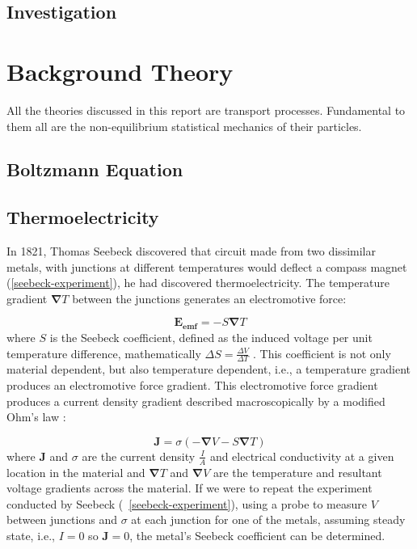 \documentclass[12pt,draft]{article}
\newcommand{\figref}[2][\figurename~]{#1\ref{#2}}
\renewcommand{\vec}[1]{\mathbf{#1}}
\begin{document}
\subsection{Investigation}

\section{Background Theory}
All the theories discussed in this report are transport processes. Fundamental to them all are the non-equilibrium statistical mechanics of their particles.

\subsection{Boltzmann Equation}

\subsection{Thermoelectricity}
In 1821, Thomas Seebeck discovered that circuit made from two dissimilar metals, with junctions at different temperatures would deflect a compass magnet (\ref{seebeck-experiment}), he had discovered thermoelectricity. The temperature gradient $\vec{\nabla} T$ between the junctions generates an electromotive force:

\begin{equation}
\label{seebeck-emf}
	\vec{E_{emf}} = -S \vec{\nabla} T
\end{equation}
where $S$ is the Seebeck coefficient, defined as the induced voltage per unit temperature difference, mathematically $\Delta S = \frac{\Delta V}{\Delta T}$ \cite{auparay}. This coefficient is not only material dependent, but also temperature dependent, i.e., a temperature gradient produces an electromotive force gradient. This electromotive force gradient produces a current density gradient described macroscopically by a modified Ohm's law \cite{ziman}:

\begin{equation}
\label{current-density}
	\vec{J} = \sigma (-\vec{\nabla} V - S \vec{\nabla} T)
\end{equation}
where $\vec{J}$ and $\sigma$ are the current density $\frac{I}{A}$ and electrical conductivity at a given location in the material and $\vec{\nabla} T$ and $\vec{\nabla} V$ are the temperature and resultant voltage gradients across the material. If we were to repeat the experiment conducted by Seebeck (\figref{seebeck-experiment}), using a probe to measure $V$ between junctions and $\sigma$ at each junction for one of the metals, assuming steady state, i.e., $I=0$ so $\vec{J} = 0$, the metal's Seebeck coefficient can be determined.
\end{document}
